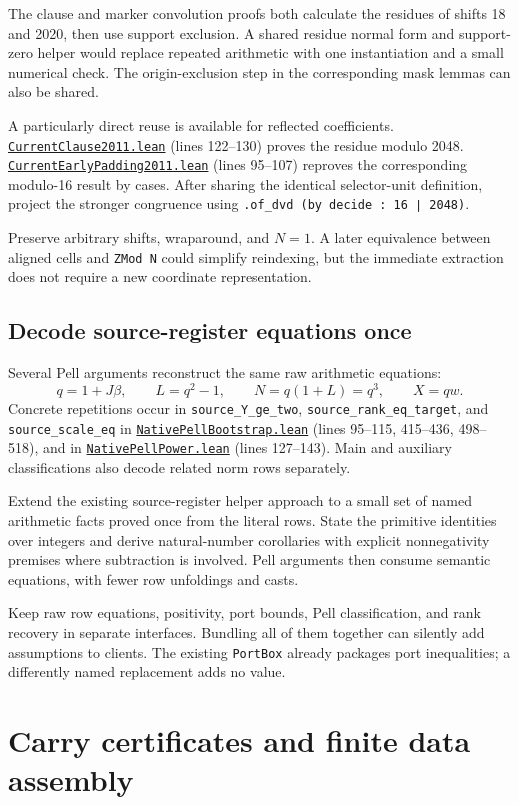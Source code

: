 \documentclass[11pt,letterpaper]{article}
\newcommand{\code}[1]{\nolinkurl{#1}}
\newcommand{\src}[2]{\href{https://github.com/VladimirReshetnikov/ProveIt/blob/60e9c5d620c6c387d932876cfa2d9376f64ea56c/Computability/DiophantineConsistency/Lean/DiophantineConsistency/#1.lean}{\nolinkurl{#1.lean}} (lines #2)}
\begin{document}
The clause and marker convolution proofs both calculate the residues
of shifts 18 and 2020, then use support exclusion. A shared residue
normal form and support-zero helper would replace repeated arithmetic
with one instantiation and a small numerical check. The origin-exclusion
step in the corresponding mask lemmas can also be shared.

A particularly direct reuse is available for reflected coefficients.
\src{CurrentClause2011}{122--130} proves the residue modulo 2048.
\src{CurrentEarlyPadding2011}{95--107} reproves the corresponding
modulo-16 result by cases. After sharing the identical selector-unit
definition, project the stronger congruence using
\code{.of_dvd (by decide : 16 ∣ 2048)}.

Preserve arbitrary shifts, wraparound, and \(N=1\). A later equivalence
between aligned cells and \code{ZMod N} could simplify reindexing, but
the immediate extraction does not require a new coordinate representation.

\subsection{Decode source-register equations once}

Several Pell arguments reconstruct the same raw arithmetic equations:
\[
q=1+J\beta,\qquad L=q^2-1,\qquad
N=q(1+L)=q^3,\qquad X=qw.
\]
Concrete repetitions occur in \code{source_Y_ge_two},
\code{source_rank_eq_target}, and \code{source_scale_eq} in
\src{NativePellBootstrap}{95--115, 415--436, 498--518}, and in
\src{NativePellPower}{127--143}. Main and auxiliary classifications
also decode related norm rows separately.

Extend the existing source-register helper approach to a small set of
named arithmetic facts proved once from the literal rows. State the
primitive identities over integers and derive natural-number corollaries
with explicit nonnegativity premises where subtraction is involved.
Pell arguments then consume semantic equations, with fewer row unfoldings
and casts.

Keep raw row equations, positivity, port bounds, Pell classification, and
rank recovery in separate interfaces. Bundling all of them together can
silently add assumptions to clients. The existing \code{PortBox} already
packages port inequalities; a differently named replacement adds no value.

\section{Carry certificates and finite data assembly}
\end{document}
